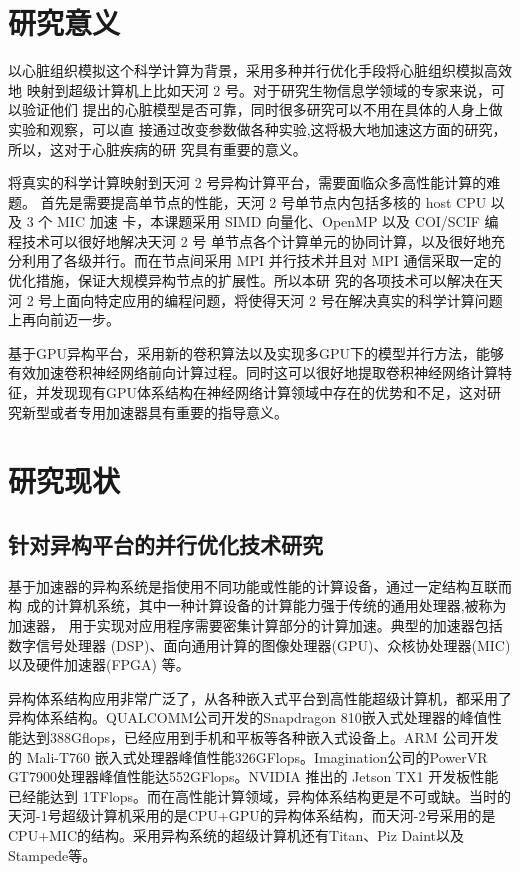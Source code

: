 \section{研究意义}
以心脏组织模拟这个科学计算为背景，采用多种并行优化手段将心脏组织模拟高效地 映射到超级计算机上比如天河 2 号。对于研究生物信息学领域的专家来说，可以验证他们 提出的心脏模型是否可靠，同时很多研究可以不用在具体的人身上做实验和观察，可以直 接通过改变参数做各种实验,这将极大地加速这方面的研究，所以，这对于心脏疾病的研 究具有重要的意义。

将真实的科学计算映射到天河 2 号异构计算平台，需要面临众多高性能计算的难题。 首先是需要提高单节点的性能，天河 2 号单节点内包括多核的 host CPU 以及 3 个 MIC 加速 卡，本课题采用 SIMD 向量化、OpenMP 以及 COI/SCIF 编程技术可以很好地解决天河 2 号 单节点各个计算单元的协同计算，以及很好地充分利用了各级并行。而在节点间采用 MPI 并行技术并且对 MPI 通信采取一定的优化措施，保证大规模异构节点的扩展性。所以本研 究的各项技术可以解决在天河 2 号上面向特定应用的编程问题，将使得天河 2 号在解决真实的科学计算问题上再向前迈一步。

基于GPU异构平台，采用新的卷积算法以及实现多GPU下的模型并行方法，能够有效加速卷积神经网络前向计算过程。同时这可以很好地提取卷积神经网络计算特征，并发现现有GPU体系结构在神经网络计算领域中存在的优势和不足，这对研究新型或者专用加速器具有重要的指导意义。

\section{研究现状}

\subsection{针对异构平台的并行优化技术研究}
基于加速器的异构系统是指使用不同功能或性能的计算设备，通过一定结构互联而构 成的计算机系统，其中一种计算设备的计算能力强于传统的通用处理器,被称为加速器， 用于实现对应用程序需要密集计算部分的计算加速。典型的加速器包括数字信号处理器 (DSP)、面向通用计算的图像处理器(GPU)、众核协处理器(MIC)以及硬件加速器(FPGA) 等。

异构体系结构应用非常广泛了，从各种嵌入式平台到高性能超级计算机，都采用了异构体系结构。QUALCOMM公司开发的Snapdragon 810嵌入式处理器的峰值性能达到388Gflops，已经应用到手机和平板等各种嵌入式设备上。ARM 公司开发的 Mali-T760 嵌入式处理器峰值性能326GFlops。Imagination公司的PowerVR GT7900处理器峰值性能达552GFlops。NVIDIA 推出的 Jetson TX1 开发板性能已经能达到 1TFlops。而在高性能计算领域，异构体系结构更是不可或缺。当时的天河-1号超级计算机采用的是CPU+GPU的异构体系结构，而天河-2号采用的是CPU+MIC的结构。采用异构系统的超级计算机还有Titan、Piz Daint以及Stampede等。

